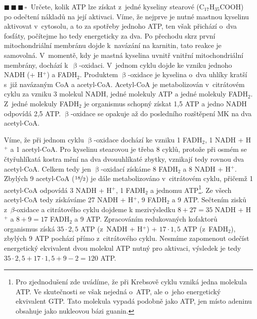 \documentclass{book}
\newcommand{\tri}{$\blacksquare \, \blacksquare \, \blacksquare \, \square \; \; $}
\renewenvironment{quotation}{\par}{\par} %
\begin{document}
\hrulefill %
\begin{quotation}
\tri Určete, kolik ATP lze získat z~jedné kyseliny stearové (C$_{17}$H$_{35}$COOH)
po odečtení nákladů na její aktivaci. Víme, že nejprve je nutné mastnou
kyselinu aktivovat v~cytosolu, a to za spotřeby jednoho ATP, ten však
přichází o~dva fosfáty, počítejme ho tedy energeticky za dva. Po přechodu
skrz první mitochondriální membránu dojde k~navázání na karnitin,
tato reakce je samovolná. V~momentě, kdy je mastná kyselina uvnitř
vnitřní mitochondriální membrány, dochází k~$\upbeta$-oxidaci. V~jednom
cyklu dojde ke vzniku jednoho NADH (+ H$^{+}$) a FADH$_{2}$. Produktem
$\upbeta$-oxidace je kyselina o~dva uhlíky kratší s~již navázaným CoA
a acetyl-CoA. Acetyl-CoA je metabolizován v~citrátovém cyklu za vzniku
3 molekul NADH, jedné molekuly ATP a jedné molekuly FADH$_{2}$. Z~jedné molekuly
FADH$_{2}$ je organismus schopný získat 1,5 ATP a jedno NADH odpovídá
2,5 ATP. $\upbeta$-oxidace se opakuje až do posledního rozštěpení MK
na dva acetyl-CoA.
\end{quotation} \dotfill \par 
Víme, že při jednom cyklu $\upbeta$-oxidace dochází ke vzniku 1 FADH$_{2}$,
1 NADH + H$^{+}$ a 1 acetyl-CoA. Pro kyselinu stearovou je třeba
8 cyklů, protože při osmém se čtyřuhlíkatá kostra mění na dva dvouuhlíkaté
zbytky, vznikají tedy rovnou dva acetyl-CoA. Celkem tedy jen $\upbeta$-oxidací
získáme 8 FADH$_{2}$ a 8 NADH + H$^{+}$. Zbylých 9 acetyl-CoA ($\nicefrac{18}{2}$)
je dále metabolizováno v~citrátovém cyklu, přičemž 1 acetyl-CoA odpovídá
3 NADH + H$^{+}$, 1 FADH$_{2}$ a jednomu ATP\footnote{Pro zjednodušení zde uvádíme, že při Krebsově cyklu vzniká jedna molekula
ATP. Ve skutečnosti se však nejedná o~ATP, ale o~jeho energetický
ekvivalent GTP. Tato molekula vypadá podobně jako ATP, jen místo
adeninu obsahuje jako nukleovou bázi guanin.}. Ze všech acetyl-CoA tedy získáváme 27 NADH + H$^{+}$, 9 FADH$_{2}$
a 9 ATP. Sečtením zisků z~$\beta$-oxidace a citrátového cyklu dojdeme
k mezivýsledku $8+27=35$ NADH + H$^{+}$ a $8+9=17$ FADH$_{2}$ a 9 ATP.
Zpracováním redukovaných kofaktorů organismus získá $35\cdot 2,5$
ATP (z~NADH + H$^{+}$) + $17\cdot 1,5$ ATP (z~FADH$_{2}$), zbylých
9 ATP pochází přímo z~citrátového cyklu. Nesmíme zapomenout odečíst
energetický ekvivalent dvou molekul ATP nutný pro aktivaci, výsledek
je tedy $35\cdot2,5+17\cdot1,5+9-2=120$ ATP. 
\end{document}
